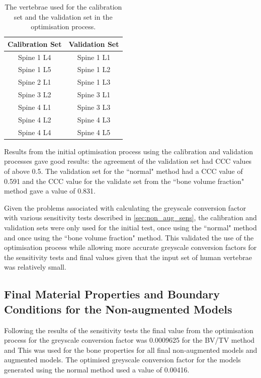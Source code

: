 \begin{table}[ht!]
	\caption{The vertebrae used for the calibration set and the validation set in
the optimisation process.}
	\label{tab:calib_valid}
	\centering
	\begin{tabular}{c|c}
    Calibration Set   & Validation Set  \\ \hline \hline
    Spine 1 L4 & Spine 1 L1  \\
    Spine 1 L5 & Spine 1 L2\\
    Spine 2 L1 & Spine 1 L3 \\
    Spine 3 L2 & Spine 3 L1\\
    Spine 4 L1 & Spine 3 L3\\
    Spine 4 L2 & Spine 4 L3\\
    Spine 4 L4 & Spine 4 L5 \\
    \hline
	\end{tabular}
\end{table}


Results from the initial optimisation process using the calibration and
validation processes gave good results: the agreement of the validation
set had CCC values of above 0.5.
The validation set for the ``normal" method had a CCC value of 0.591 and the
CCC value for the validate set from the ``bone volume fraction" method gave a
value of 0.831.

Given the problems associated with calculating the greyscale conversion factor
with various sensitivity tests described in \cref{sec:non_aug_sens}, the
calibration and validation sets were only used for the initial test, once using
the ``normal" method and once using the ``bone volume fraction" method.
This validated the use of the optimisation process while allowing more accurate
greyscale conversion factors for the sensitivity tests and final values given
that the input set of human vertebrae was relatively small.


\subsection{Final Material Properties and Boundary Conditions for the Non-augmented Models} \label{sec:nonaugmatprop}

Following the results of the sensitivity tests the final value from the
optimisation process for the greyscale conversion factor was 0.0009625 for the BV/TV method and 
This was used for the bone properties for all final non-augmented models and
augmented models. The optimised greyscale conversion factor for the models generated using the normal method used a value of 0.00416.

